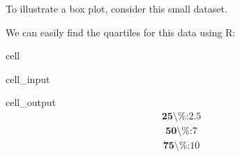 \documentclass[letterpaper,10pt,english]{jupyterBook}
\begin{document}
\sphinxAtStartPar
To illustrate a box plot, consider this small dataset.



\sphinxAtStartPar
We can easily find the quartiles for this data using R:

\begin{sphinxuseclass}{cell}\begin{sphinxVerbatimInput}

\begin{sphinxuseclass}{cell_input}
\begin{sphinxVerbatim}[commandchars=\\\{\}]

\end{sphinxVerbatim}

\end{sphinxuseclass}\end{sphinxVerbatimInput}
\begin{sphinxVerbatimOutput}

\begin{sphinxuseclass}{cell_output}\begin{equation*}
\begin{split}\textbf{25\textbackslash{}\%:} 2.5\end{split}
\end{equation*}\begin{equation*}
\begin{split}\textbf{50\textbackslash{}\%:} 7\end{split}
\end{equation*}\begin{equation*}
\begin{split}\textbf{75\textbackslash{}\%:} 10\end{split}
\end{equation*}
\end{sphinxuseclass}\end{sphinxVerbatimOutput}

\end{sphinxuseclass}
\end{document}
